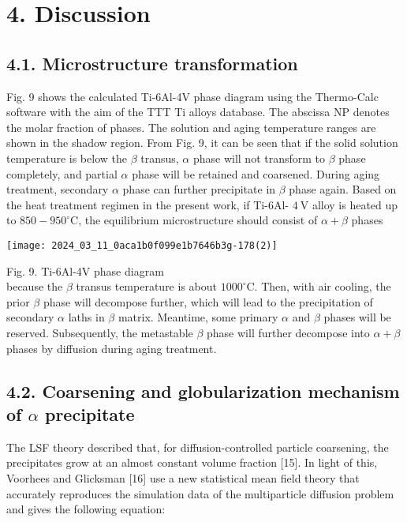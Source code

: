 \documentclass[10pt]{article}
\begin{document}
\section*{4. Discussion}
\subsection*{4.1. Microstructure transformation}
Fig. 9 shows the calculated Ti-6Al-4V phase diagram using the Thermo-Calc software with the aim of the TTT Ti alloys database. The abscissa NP denotes the molar fraction of phases. The solution and aging temperature ranges are shown in the shadow region. From Fig. 9, it can be seen that if the solid solution temperature is below the $\beta$ transus, $\alpha$ phase will not transform to $\beta$ phase completely, and partial $\alpha$ phase will be retained and coarsened. During aging treatment, secondary $\alpha$ phase can further precipitate in $\beta$ phase again. Based on the heat treatment regimen in the present work, if Ti-6Al- $4 \mathrm{~V}$ alloy is heated up to $850-950^{\circ} \mathrm{C}$, the equilibrium microstructure should consist of $\alpha+\beta$ phases

\begin{center}
\texttt{[image: 2024\_03\_11\_0aca1b0f099e1b7646b3g-178(2)]}
\end{center}

Fig. 9. Ti-6Al-4V phase diagram\\
because the $\beta$ transus temperature is about $1000^{\circ} \mathrm{C}$. Then, with air cooling, the prior $\beta$ phase will decompose further, which will lead to the precipitation of secondary $\alpha$ laths in $\beta$ matrix. Meantime, some primary $\alpha$ and $\beta$ phases will be reserved. Subsequently, the metastable $\beta$ phase will further decompose into $\alpha+\beta$ phases by diffusion during aging treatment.

\subsection*{4.2. Coarsening and globularization mechanism of $\alpha$ precipitate}
The LSF theory described that, for diffusion-controlled particle coarsening, the precipitates grow at an almost constant volume fraction [15]. In light of this, Voorhees and Glicksman [16] use a new statistical mean field theory that accurately reproduces the simulation data of the multiparticle diffusion problem and gives the following equation:
\end{document}
